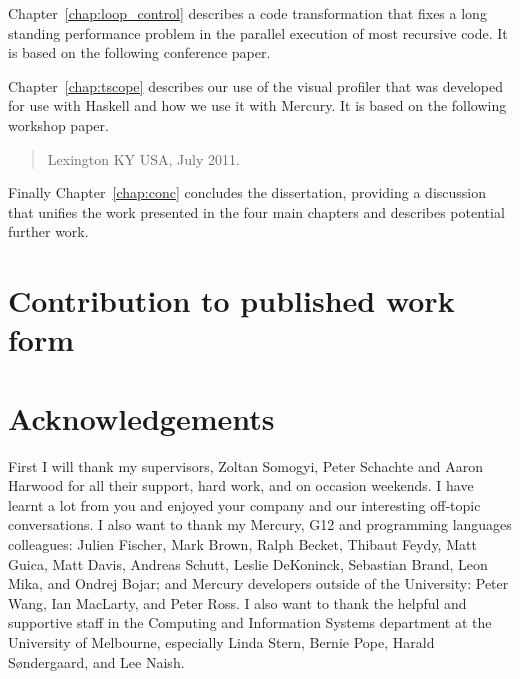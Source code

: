 \documentclass[a4paper,twoside,openright]{report}
\begin{document}
Chapter~\ref{chap:loop_control} describes a code transformation that fixes 
a long standing performance problem in the parallel execution of most
recursive code.
It is based on the following conference paper.

\begin{quote}
\end{quote}

Chapter~\ref{chap:tscope} describes our use of the \tscope visual
profiler that was developed for use with Haskell and how we use it with
Mercury.
It is based on the following workshop paper.

\begin{quote}
{Lexington KY USA, July 2011.}
\end{quote}

Finally Chapter~\ref{chap:conc} concludes the dissertation, providing a
discussion that unifies the work presented in the four main chapters and
describes potential further work.

\chapter*{Contribution to published work form}


\chapter*{Acknowledgements}

First I will thank my supervisors,
Zoltan Somogyi,
Peter Schachte and
Aaron Harwood
for all their support, hard work, and on occasion weekends.
I have learnt a lot from you and enjoyed your company and our interesting
off-topic conversations.
I also want to thank my Mercury, G12 and programming languages colleagues:
Julien Fischer,
Mark Brown,
Ralph Becket, 
Thibaut Feydy,
Matt Guica,
Matt Davis,
Andreas Schutt,
Leslie DeKoninck,
Sebastian Brand,
Leon Mika,
and
Ondrej Bojar;
and Mercury developers outside of the University:
Peter Wang,
Ian MacLarty,
and
Peter Ross.
I also want to thank the helpful and supportive staff in the Computing and
Information Systems department at the University of Melbourne,
especially
Linda Stern,
Bernie Pope,
Harald S{\o}ndergaard, and
Lee Naish.
\end{document}
